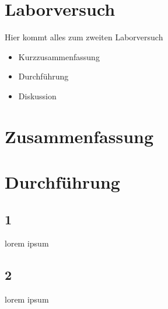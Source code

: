 \newpage
\section{Laborversuch}
Hier kommt alles zum zweiten Laborversuch

\begin{itemize}
    \item Kurzzusammenfassung
    \item Durchführung
    \item Diskussion
\end{itemize}

\section*{Zusammenfassung}

\section*{Durchführung}
\subsection*{1}
lorem ipsum

\subsection*{2}
lorem ipsum